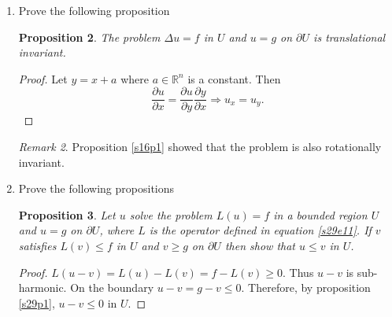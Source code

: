 \documentclass{article}
\newcommand{\pd}[2]{\frac{\partial{#1}}{\partial{#2}}}
\DeclareMathOperator*{\Int}{Int}
\theoremstyle{plain}
\numberwithin{thm}{section}
\theoremstyle{plain}
\newtheorem{prop}{Proposition}
\numberwithin{prop}{section}
\theoremstyle{definition}
\numberwithin{defn}{section}
\theoremstyle{remark}
\newtheorem*{rem}{Remark}
\numberwithin{equation}{section}
\begin{document}
\begin{enumerate}
\begin{prop}\label{s29p5}
Continuing with the same definitions as in proposition \ref{s29p4}, if $L(u) \ge 0$ and if $u \le M$ on $\partial
U$ then $u \le M$ in $U$.
\end{prop}
\begin{proof}
Consider 
\[
L(e^{\alpha x_1}) = \alpha^2 e^{\alpha x_1} + \alpha b_1(x) e^{\alpha x_1} = \alpha e^{\alpha x_1}(\alpha +b_1(x))
\]
Since $b_1$ is continuous in the bounded set $U$, $b_1$ is itself bounded. Therefore, we can always choose
$\alpha$ such that $L(e^{\alpha x_1}) \ge 0$. For such an $\alpha$, define the function
\[
v = u + e^{\alpha x_1}
\]
so that $L(v) \ge 0$. Since $v$ too is continuous in the bounded set $U$, it has a maximum, say $N$. Let, if
possible, $v$ attain its maximum at $x_0 \in \Int U$. Then $L(v)(x_0) = (\Delta v)(x_0) \ge 0$, which is possible
only if $v_{x_ix_i} \ge 0$ for all $i = 1, \ldots, n$. But this contradicts with the fact that $v$ attains its
maximum at $x_0$. Therefore $v$ attains maximum $N$ on $\partial U$ and hence, 
\[
N = M + \max\{e^{\alpha x_1} : x_1 \in \partial U\}.
\]
Now $v \le N$ in $U$ also means that $u \le N$ in $U$. Therefore,
\[
u \le M + \max\{e^{\alpha x_1} : x_1 \in \partial U\} \in U.
\]
This also means that $u \le M$ in $U$. For if it was not so then we can choose an $\alpha$ so that the above
inequality is violated.
\end{proof}
\begin{rem}
We chose $\alpha$ at two places in the above proof. Once at the beginning and other at the end. In either cases,
choosing a greater $\alpha$ is ``better'' and hence the two choices cannot contradict each other.
\end{rem}

\item Prove the following proposition
\begin{prop}\label{s29p6}
The problem $\Delta u = f$ in $U$ and $u = g$ on $\partial U$ is translational invariant.
\end{prop}
\begin{proof}
Let $y = x + a$ where $a \in \mathbb{R}^n$ is a constant. Then
\[
\pd{u}{x} = \pd{u}{y}\pd{y}{x} \Rightarrow u_x = u_y.
\]
\end{proof}
\begin{rem}
Proposition \ref{s16p1} showed that the problem is also rotationally invariant.
\end{rem}

\item Prove the following propositions
\begin{prop}\label{s29p7}
Let $u$ solve the problem $L(u) = f$ in a bounded region $U$ and $u = g$ on $\partial U$, where $L$ is the operator
defined in equation \eqref{s29e11}. If $v$ satisfies $L(v) \le f$ in $U$ and $v \ge g$ on $\partial U$ then show
that $u \le v$ in $U$.
\end{prop}
\begin{proof}
$L(u - v) = L(u) - L(v) = f - L(v) \ge 0$. Thus $u - v$ is sub-harmonic. On the boundary $u - v = g - v \le 0$. 
Therefore, by proposition \ref{s29p1}, $u - v \le 0$ in $U$.
\end{proof}


\end{enumerate}
\end{document}
